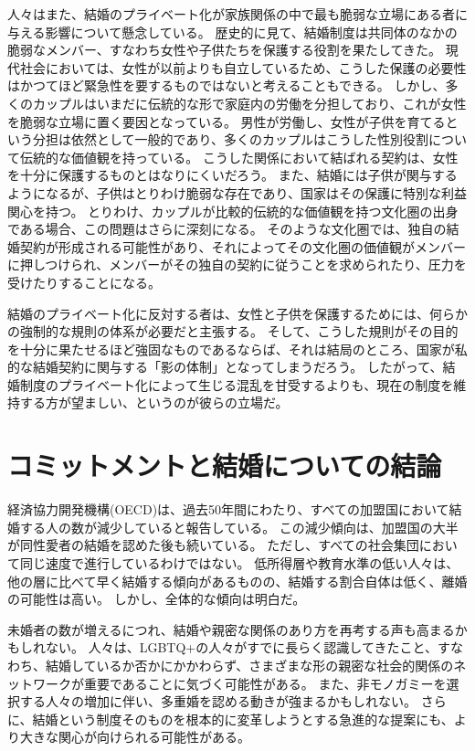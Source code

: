 \documentclass[paper=a4,book,openany]{jlreq}
\begin{document}
人々はまた、結婚のプライベート化が家族関係の中で最も脆弱な立場にある者に与える影響について懸念している。
歴史的に見て、結婚制度は共同体のなかの脆弱なメンバー、すなわち女性や子供たちを保護する役割を果たしてきた。
現代社会においては、女性が以前よりも自立しているため、こうした保護の必要性はかつてほど緊急性を要するものではないと考えることもできる。
しかし、多くのカップルはいまだに伝統的な形で家庭内の労働を分担しており、これが女性を脆弱な立場に置く要因となっている。
男性が労働し、女性が子供を育てるという分担は依然として一般的であり、多くのカップルはこうした性別役割について伝統的な価値観を持っている。
こうした関係において結ばれる契約は、女性を十分に保護するものとはなりにくいだろう。
また、結婚には子供が関与するようになるが、子供はとりわけ脆弱な存在であり、国家はその保護に特別な利益関心を持つ。
とりわけ、カップルが比較的伝統的な価値観を持つ文化圏の出身である場合、この問題はさらに深刻になる。
そのような文化圏では、独自の結婚契約が形成される可能性があり、それによってその文化圏の価値観がメンバーに押しつけられ、メンバーがその独自の契約に従うことを求められたり、圧力を受けたりすることになる。

結婚のプライベート化に反対する者は、女性と子供を保護するためには、何らかの強制的な規則の体系が必要だと主張する。
そして、こうした規則がその目的を十分に果たせるほど強固なものであるならば、それは結局のところ、国家が私的な結婚契約に関与する「影の体制」となってしまうだろう。
したがって、結婚制度のプライベート化によって生じる混乱を甘受するよりも、現在の制度を維持する方が望ましい、というのが彼らの立場だ\citep[p.204]{hartley12:_polit_liber_marriag_famil}。

\section{コミットメントと結婚についての結論}

経済協力開発機構(OECD)は、過去50年間にわたり、すべての加盟国において結婚する人の数が減少していると報告している\citep{oecd22:_marriag_divor_rates}。
この減少傾向は、加盟国の大半が同性愛者の結婚を認めた後も続いている。
ただし、すべての社会集団において同じ速度で進行しているわけではない。
低所得層や教育水準の低い人々は、他の層に比べて早く結婚する傾向があるものの、結婚する割合自体は低く、離婚の可能性は高い\citep{lundberg16:_famil_inequal}。
しかし、全体的な傾向は明白だ。

未婚者の数が増えるにつれ、結婚や親密な関係のあり方を再考する声も高まるかもしれない。
人々は、LGBTQ+の人々がすでに長らく認識してきたこと、すなわち、結婚しているか否かにかかわらず、さまざまな形の親密な社会的関係のネットワークが重要であることに気づく可能性がある。
また、非モノガミーを選択する人々の増加に伴い、多重婚を認める動きが強まるかもしれない。
さらに、結婚という制度そのものを根本的に変革しようとする急進的な提案にも、より大きな関心が向けられる可能性がある。
\end{document}
